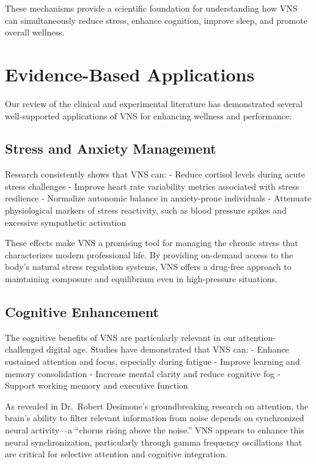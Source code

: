 \documentclass[
  Letterpaper,
]{scrbook}
\begin{document}
These mechanisms provide a scientific foundation for understanding how
VNS can simultaneously reduce stress, enhance cognition, improve sleep,
and promote overall wellness.

\section{Evidence-Based Applications}\label{evidence-based-applications}

Our review of the clinical and experimental literature has demonstrated
several well-supported applications of VNS for enhancing wellness and
performance:

\subsection{Stress and Anxiety
Management}\label{stress-and-anxiety-management}

Research consistently shows that VNS can: - Reduce cortisol levels
during acute stress challenges - Improve heart rate variability metrics
associated with stress resilience - Normalize autonomic balance in
anxiety-prone individuals - Attenuate physiological markers of stress
reactivity, such as blood pressure spikes and excessive sympathetic
activation

These effects make VNS a promising tool for managing the chronic stress
that characterizes modern professional life. By providing on-demand
access to the body's natural stress regulation systems, VNS offers a
drug-free approach to maintaining composure and equilibrium even in
high-pressure situations.

\subsection{Cognitive Enhancement}\label{cognitive-enhancement}

The cognitive benefits of VNS are particularly relevant in our
attention-challenged digital age. Studies have demonstrated that VNS
can: - Enhance sustained attention and focus, especially during fatigue
- Improve learning and memory consolidation - Increase mental clarity
and reduce cognitive fog - Support working memory and executive function

As revealed in Dr.~Robert Desimone's groundbreaking research on
attention, the brain's ability to filter relevant information from noise
depends on synchronized neural activity---a ``chorus rising above the
noise.'' VNS appears to enhance this neural synchronization,
particularly through gamma frequency oscillations that are critical for
selective attention and cognitive integration.
\end{document}

